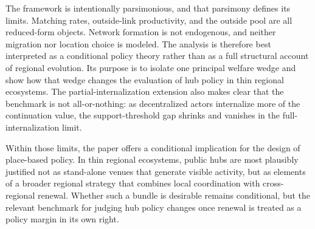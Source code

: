 The framework is intentionally parsimonious, and that parsimony defines its limits. Matching rates, outside-link productivity, and the outside pool are all reduced-form objects. Network formation is not endogenous, and neither migration nor location choice is modeled. The analysis is therefore best interpreted as a conditional policy theory rather than as a full structural account of regional evolution. Its purpose is to isolate one principal welfare wedge and show how that wedge changes the evaluation of hub policy in thin regional ecosystems. The partial-internalization extension also makes clear that the benchmark is not all-or-nothing: as decentralized actors internalize more of the continuation value, the support-threshold gap shrinks and vanishes in the full-internalization limit.

Within those limits, the paper offers a conditional implication for the design of place-based policy. In thin regional ecosystems, public hubs are most plausibly justified not as stand-alone venues that generate visible activity, but as elements of a broader regional strategy that combines local coordination with cross-regional renewal. Whether such a bundle is desirable remains conditional, but the relevant benchmark for judging hub policy changes once renewal is treated as a policy margin in its own right.
